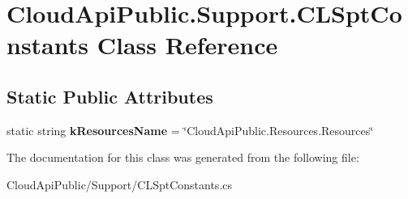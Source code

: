 \hypertarget{class_cloud_api_public_1_1_support_1_1_c_l_spt_constants}{\section{Cloud\-Api\-Public.\-Support.\-C\-L\-Spt\-Constants Class Reference}
\label{class_cloud_api_public_1_1_support_1_1_c_l_spt_constants}
}
\subsection*{Static Public Attributes}
\begin{DoxyCompactItemize}
\item 
\hypertarget{class_cloud_api_public_1_1_support_1_1_c_l_spt_constants_aa1d1f7623fdfd0dfc0829b5e37392ab2}{static string {\bfseries k\-Resources\-Name} = \char`\"{}Cloud\-Api\-Public.\-Resources.\-Resources\char`\"{}}\label{class_cloud_api_public_1_1_support_1_1_c_l_spt_constants_aa1d1f7623fdfd0dfc0829b5e37392ab2}

\end{DoxyCompactItemize}


The documentation for this class was generated from the following file\-:\begin{DoxyCompactItemize}
\item 
Cloud\-Api\-Public/\-Support/C\-L\-Spt\-Constants.\-cs\end{DoxyCompactItemize}

